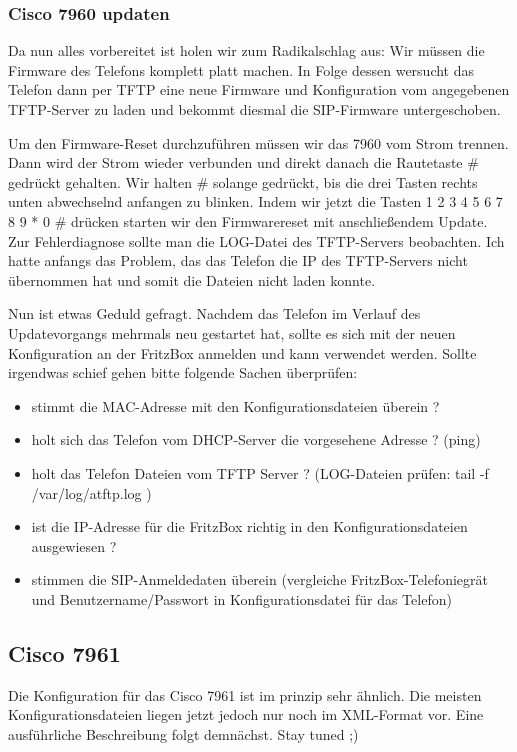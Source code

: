 \documentclass[a4paper,12pt]{scrbook}
\begin{document}
\subsubsection{Cisco 7960 updaten}
Da nun alles vorbereitet ist holen wir zum Radikalschlag aus: Wir müssen die Firmware des Telefons komplett platt machen. In Folge dessen wersucht das
Telefon dann per TFTP eine neue Firmware und Konfiguration vom angegebenen TFTP-Server zu laden und bekommt diesmal die SIP-Firmware untergeschoben.

Um den Firmware-Reset durchzuführen müssen wir das 7960 vom Strom trennen. Dann wird der Strom wieder verbunden und direkt danach die Rautetaste \# gedrückt gehalten.
Wir halten \# solange gedrückt, bis die drei Tasten rechts unten abwechselnd anfangen zu blinken. Indem wir jetzt die Tasten 1 2 3 4 5 6 7 8 9 * 0 \# drücken starten wir den
Firmwarereset mit anschließendem Update. Zur Fehlerdiagnose sollte man die LOG-Datei des TFTP-Servers beobachten. Ich hatte anfangs das Problem, das das Telefon die IP des TFTP-Servers
nicht übernommen hat und somit die Dateien nicht laden konnte. 

Nun ist etwas Geduld gefragt. Nachdem das Telefon im Verlauf des Updatevorgangs mehrmals neu gestartet hat, sollte es sich mit der neuen Konfiguration an der FritzBox anmelden und kann 
verwendet werden. Sollte irgendwas schief gehen bitte folgende Sachen überprüfen:

\begin{itemize}
 \item stimmt die MAC-Adresse mit den Konfigurationsdateien überein ?
 \item holt sich das Telefon vom DHCP-Server die vorgesehene Adresse ? (ping)
 \item holt das Telefon Dateien vom TFTP Server ? (LOG-Dateien prüfen: tail -f /var/log/atftp.log )
 \item ist die IP-Adresse für die FritzBox richtig in den Konfigurationsdateien ausgewiesen ?
 \item stimmen die SIP-Anmeldedaten überein (vergleiche FritzBox-Telefoniegrät und Benutzername/Passwort in Konfigurationsdatei für das Telefon) 
\end{itemize}


\subsection{Cisco 7961}
Die Konfiguration für das Cisco 7961 ist im prinzip sehr ähnlich. Die meisten Konfigurationsdateien liegen jetzt jedoch nur noch im XML-Format vor.
Eine ausführliche Beschreibung folgt demnächst. Stay tuned ;)
\end{document}
